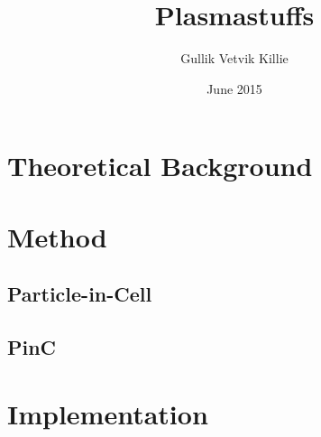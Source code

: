 \documentclass[x11names,twoside,english]{uiofysmaster}
\author{Gullik Vetvik Killie}
\title{Plasmastuffs}
\date{June 2015}
\begin{document}
% 
%
\tableofcontents
% 
%     

%     

\chapter{Theoretical Background}
    
    
    
    
    
    
    
%
\chapter{Method}
    
	\section{Particle-in-Cell}
    
    
	\section{PinC}
	
    
    
    
    
    

\chapter{Implementation}
    
    
    
    
\end{document}
